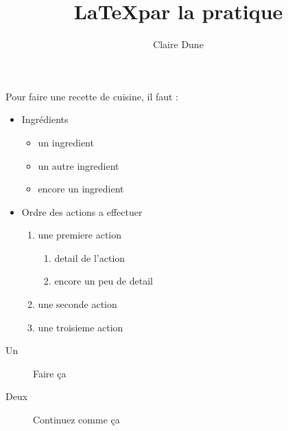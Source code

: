 \documentclass[10pt,a4paper]{article}
\author{Claire Dune}
\title{\LaTeX par la pratique}
\begin{document}
Pour faire une recette de cuisine, il faut : 

\begin{itemize}
	\item Ingrédients
		\begin{itemize}
			\item un  ingredient
			\item un autre ingredient
			\item encore un ingredient
		\end{itemize}
	\item  Ordre des actions a effectuer
		\begin{enumerate}
			\item une premiere action
				\begin{enumerate}
					\item detail de l'action
					\item encore un peu de detail		
				\end{enumerate}
			\item une seconde action
			\item une troisieme action
		\end{enumerate}
\end{itemize}

\begin{description}
\item[Un] Faire ça
\item[Deux] Continuez comme ça
\end{description}
\end{document}
